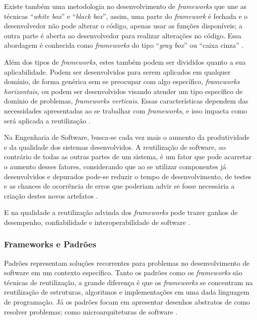 Existe também uma metodologia no desenvolvimento de \textit{frameworks} que une as técnicas ``\textit{white box}'' e ``\textit{black box}'', assim, uma parte do \textit{framework} é fechada e o desenvolvedor não pode alterar o código, apenas usar as funções disponíveis; a outra parte é aberta ao desenvolvedor para realizar alterações no código. Essa abordagem é conhecida como \textit{frameworks} do tipo ``\textit{gray box}'' ou ``caixa cinza'' \cite{Kristensen:2004}.

Além dos tipos de \textit{frameworks}, estes também podem ser divididos quanto a sua aplicabilidade. Podem ser desenvolvidos para serem aplicados em qualquer domínio, de forma genérica sem se preocupar com algo específico, \textit{frameworks horizontais}, ou podem ser desenvolvidos visando atender um tipo específico de domínio de problemas, \textit{frameworks verticais}. Essas características dependem das necessidades apresentadas ao se trabalhar com \textit{frameworks}, e isso impacta como será aplicada a reutilização \cite{Kroth:2000}.

Na Engenharia de Software, busca-se cada vez mais o aumento da produtividade e da qualidade dos sistemas desenvolvidos. A reutilização de software, ao contrário de todas as outras partes de um sistema, é um fator que pode acarretar o aumento desses fatores, considerando que ao se utilizar componentes já desenvolvidos e depurados pode-se reduzir o tempo de desenvolvimento, de testes e as chances de ocorrência de erros que poderiam advir se fosse necessária a criação destes novos artefatos \cite{Silva:2000}.

E na qualidade a reutilização advinda dos \textit{frameworks} pode trazer ganhos de desempenho, confiabilidade e interoperabilidade de software \cite{Fayad:Schimidt:1997}.

\subsubsection{Frameworks e Padrões}

Padrões representam soluções recorrentes para problemas no desenvolvimento de software em um contexto específico. Tanto os padrões como os \textit{frameworks} são técnicas de reutilização, a grande diferença é que os \textit{frameworks} 	se concentram na reutilização de estruturas, algoritmos e implementações em uma dada linguagem de programação. Já os padrões focam em apresentar desenhos abstratos de como resolver problemas; como microarquiteturas de software \cite{Fayad:Schimidt:1997}.

